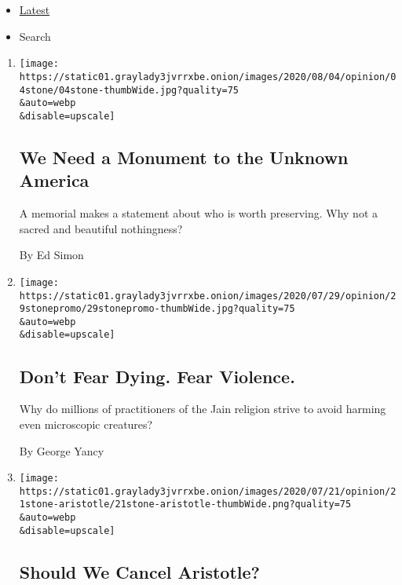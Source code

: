 \begin{itemize}
\tightlist
\item
  \protect\hyperlink{stream-panel}{Latest}
\item
  Search
\end{itemize}

\begin{enumerate}
\def\labelenumi{\arabic{enumi}.}
\item
  \href{/2020/08/04/opinion/us-monuments-rome-unknown-god.html}{}

  \texttt{[image: https://static01.graylady3jvrrxbe.onion/images/2020/08/04/opinion/04stone/04stone-thumbWide.jpg?quality=75\\\&auto=webp\\\&disable=upscale]}

  \hypertarget{we-need-a-monument-to-the-unknown-america}{%
  \subsection{We Need a Monument to the Unknown
  America}\label{we-need-a-monument-to-the-unknown-america}}

  A memorial makes a statement about who is worth preserving. Why not a
  sacred and beautiful nothingness?

  By Ed Simon
\item
  \href{/2020/07/29/opinion/jainism-nonviolence-death.html}{}

  \texttt{[image: https://static01.graylady3jvrrxbe.onion/images/2020/07/29/opinion/29stonepromo/29stonepromo-thumbWide.jpg?quality=75\\\&auto=webp\\\&disable=upscale]}

  \hypertarget{dont-fear-dying-fear-violence}{%
  \subsection{Don't Fear Dying. Fear
  Violence.}\label{dont-fear-dying-fear-violence}}

  Why do millions of practitioners of the Jain religion strive to avoid
  harming even microscopic creatures?

  By George Yancy
\item
  \href{/2020/07/21/opinion/should-we-cancel-aristotle.html}{}

  \texttt{[image: https://static01.graylady3jvrrxbe.onion/images/2020/07/21/opinion/21stone-aristotle/21stone-aristotle-thumbWide.png?quality=75\\\&auto=webp\\\&disable=upscale]}

  \hypertarget{should-we-cancel-aristotle}{%
  \subsection{Should We Cancel
  Aristotle?}\label{should-we-cancel-aristotle}}


\end{enumerate}
